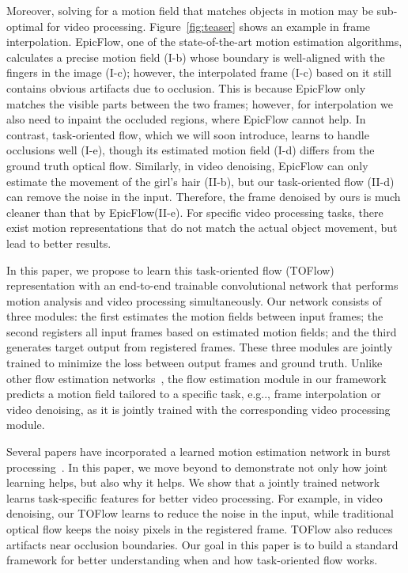 \documentclass[twocolumn,natbib]{svjour3}          \smartqed  \usepackage{graphicx}
\makeatletter
\newcommand{\fig}[1]{Figure~\ref{#1}}
\def\model{TOFlow\xspace}
\def\epicflow{EpicFlow\xspace}
\DeclareRobustCommand\onedot{\futurelet\@let@token\@onedot}
\def\@onedot{\ifx\@let@token.\else.\null\fi\xspace}
\def\eg{e.g\onedot} \def\Eg{E.g\onedot}
\makeatother
\begin{document}
Moreover, solving for a motion field that matches objects in motion may be sub-optimal for video processing. \fig{fig:teaser} shows an example in frame interpolation. \epicflow \citep{Revaud2015Epicflow}, one of the state-of-the-art motion estimation algorithms, calculates a precise motion field (I-b) whose boundary is well-aligned with the fingers in the image (I-c); however, the interpolated frame (I-c) based on it still contains obvious artifacts due to occlusion. This is because \epicflow only matches the visible parts between the two frames; however, for interpolation we also need to inpaint the occluded regions, where \epicflow cannot help. In contrast, task-oriented flow, which we will soon introduce, learns to handle occlusions well (I-e), though its estimated motion field (I-d) differs from the ground truth optical flow. 
Similarly, in video denoising, \epicflow can only estimate the movement of the girl's hair (II-b), but our task-oriented flow (II-d) can remove the noise in the input. 
Therefore, the frame denoised by ours is much cleaner than that by \epicflow (II-e). For specific video processing tasks, there exist motion representations that do not match the actual object movement, but lead to better results.

In this paper, we propose to learn this task-oriented flow (\model) representation with an end-to-end trainable convolutional network that performs motion analysis and video processing simultaneously.
Our network consists of three modules: the first estimates the motion fields between input frames; the second registers all input frames based on estimated motion fields; and the third generates target output from registered frames.
These three modules are jointly trained to minimize the loss between output frames and ground truth. Unlike other flow estimation networks~\citep{Ranjan2017Optical,Fischer2015Flownet:}, the flow estimation module in our framework predicts a motion field tailored to a specific task, \eg, frame interpolation or video denoising, as it is jointly trained with the corresponding video processing module.


Several papers have incorporated a learned motion estimation network in burst processing~\citep{tao2017detail,Liu2017Video}. In this paper, we move beyond to demonstrate not only how joint learning helps, but also why it helps. We show that a jointly trained network learns task-specific features for better video processing. For example, in video denoising, our \model learns to reduce the noise in the input, while traditional optical flow keeps the noisy pixels in the registered frame. \model also reduces artifacts near occlusion boundaries. Our goal in this paper is to build a standard framework for better understanding when and how task-oriented flow works.
\end{document}
